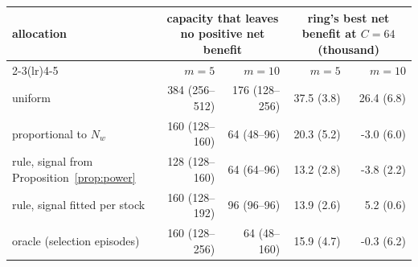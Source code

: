 \begin{tabular}{lrrrr}
\toprule
allocation & \multicolumn{2}{c}{capacity that leaves no positive net benefit} & \multicolumn{2}{c}{ring's best net benefit at $C=64$ (thousand)} \\
\cmidrule(lr){2-3}\cmidrule(lr){4-5}
& $m=5$ & $m=10$ & $m=5$ & $m=10$ \\
\midrule
uniform & 384 (256--512) & 176 (128--256) & 37.5 (3.8) & 26.4 (6.8) \\
proportional to $N_w$ & 160 (128--160) & 64 (48--96) & 20.3 (5.2) & -3.0 (6.0) \\
rule, signal from Proposition~\ref{prop:power} & 128 (128--160) & 64 (64--96) & 13.2 (2.8) & -3.8 (2.2) \\
rule, signal fitted per stock & 160 (128--192) & 96 (96--96) & 13.9 (2.6) & 5.2 (0.6) \\
oracle (selection episodes) & 160 (128--256) & 64 (48--160) & 15.9 (4.7) & -0.3 (6.2) \\
\bottomrule
\end{tabular}
